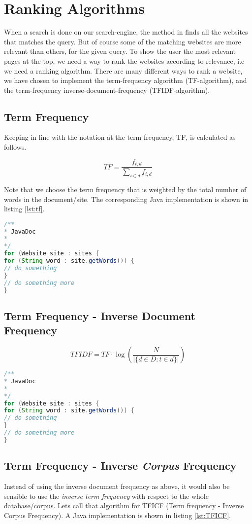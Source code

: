 \section{Ranking Algorithms}
When a search is done on our search-engine, the method  in  finds all the websites that matches the query. But of course some of the matching websites are more relevant than others, for the given query. To show the user the most relevant pages at the top, we need a way to rank the websites according to relevance, i.e we need a ranking algorithm. There are many different ways to rank a website, we have chosen to implement the term-frequency algorithm (TF-algorithm), and the term-frequency inverse-document-frequency (TFIDF-algorithm).    

\subsection{Term Frequency}
Keeping in line with the notation at \cite{wikiTFIDF} the term frequency, TF, is calculated as follows.

\[ TF = \frac{f_{t,d}}{\sum_{i \in d}f_{i,d}} \]

Note that we choose the term frequency that is weighted by the total number of words in the document/site. The corresponding Java implementation is shown in listing \ref{lst:tf}.

\begin{lstlisting}[language=Java,
					caption={Implementation of calculating TF rating.},
					label={lst:tf}]
/**
* JavaDoc
*
*/
for (Website site : sites {
for (String word : site.getWords()) {
// do something	
}
// do something more
}

\end{lstlisting}


\subsection{Term Frequency - Inverse Document Frequency}
\[ TFIDF = TF \cdot \log{\left(\frac{N}{|\{d \in D : t \in d \}|}\right)}  \]

\begin{lstlisting}[language=Java, caption=This is a code example.]
/**
* JavaDoc
*
*/
for (Website site : sites {
for (String word : site.getWords()) {
// do something	
}
// do something more
}
\end{lstlisting}


\subsection{Term Frequency - Inverse \emph{Corpus} Frequency}
Instead of using the inverse document frequency as above, it would also be sensible to use the \emph{inverse term frequency} with respect to the whole database/corpus. Lets call that algorithm for TFICF (Term frequency - Inverse Corpus Frequency). A Java implementation is shown in listing \ref{lst:TFICF}.
    
